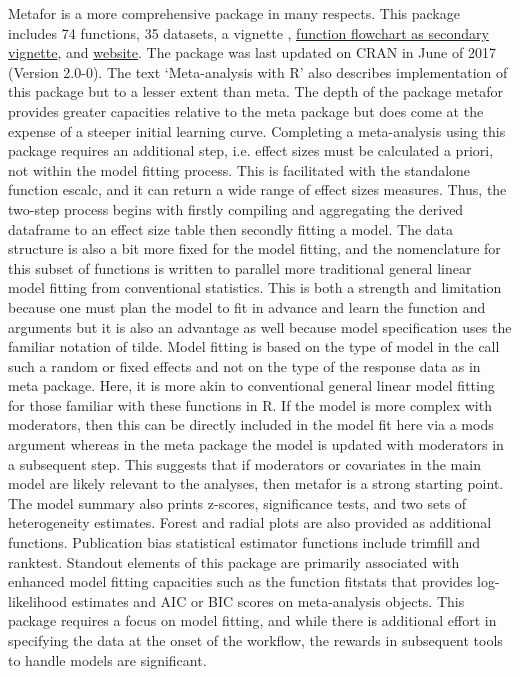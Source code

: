 Metafor is a more comprehensive package in many respects.  This package includes 74 functions, 35 datasets, a vignette \citep{RN4896}, \href{https://cran.r-project.org/web/packages/metafor/vignettes/diagram.pdf}{function flowchart as secondary vignette}, and \href{http://www.metafor-project.org/doku.php}{website}.  The package was last updated on CRAN in June of 2017 (Version 2.0-0).  The text ‘Meta-analysis with R’ also describes implementation of this package \citep{RN6199} but to a lesser extent than meta.  The depth of the package metafor provides greater capacities relative to the meta package but does come at the expense of a steeper initial learning curve.  Completing a meta-analysis using this package requires an additional step, i.e. effect sizes must be calculated a priori, not within the model fitting process.  This is facilitated with the standalone function escalc, and it can return a wide range of effect sizes measures. Thus, the two-step process begins with firstly compiling and aggregating the derived dataframe to an effect size table then secondly fitting a model.  The data structure is also a bit more fixed for the model fitting, and the nomenclature for this subset of functions is written to parallel more traditional general linear model fitting from conventional statistics.  This is both a strength and limitation because one must plan the model to fit in advance and learn the function and arguments but it is also an advantage as well because model specification uses the familiar notation of tilde.  Model fitting is based on the type of model in the call such a random or fixed effects and not on the type of the response data as in meta package.  Here, it is more akin to conventional general linear model fitting for those familiar with these functions in R.  If the model is more complex with moderators, then this can be directly included in the model fit here via a mods argument whereas in the meta package the model is updated with moderators in a subsequent step.  This suggests that if moderators or covariates in the main model are likely relevant to the analyses, then metafor is a strong starting point.  The model summary also prints z-scores, significance tests, and two sets of heterogeneity estimates.  Forest and radial plots are also provided as additional functions.  Publication bias statistical estimator functions include trimfill and ranktest.  Standout elements of this package are primarily associated with enhanced model fitting capacities such as the function fitstats that provides log-likelihood estimates and AIC or BIC scores on meta-analysis objects.  This package requires a focus on model fitting, and while there is additional effort in specifying the data at the onset of the workflow, the rewards in subsequent tools to handle models are significant.


